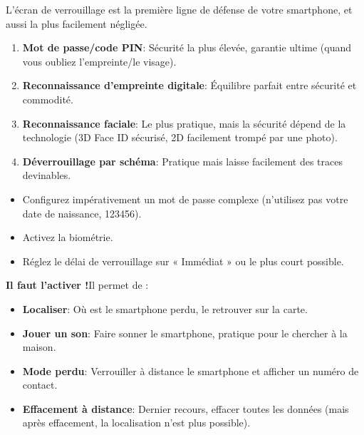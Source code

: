 


L'écran de verrouillage est la première ligne de défense de votre smartphone, et aussi la plus facilement négligée.


\begin{enumerate}
  \item \textbf{Mot de passe/code PIN}: Sécurité la plus élevée, garantie ultime (quand vous oubliez l'empreinte/le visage).
  \item \textbf{Reconnaissance d'empreinte digitale}: Équilibre parfait entre sécurité et commodité.
  \item \textbf{Reconnaissance faciale}: Le plus pratique, mais la sécurité dépend de la technologie (3D Face ID sécurisé, 2D facilement trompé par une photo).
  \item \textbf{Déverrouillage par schéma}: Pratique mais laisse facilement des traces devinables.
\end{enumerate}


\begin{itemize}
  \item Configurez impérativement un mot de passe complexe (n'utilisez pas votre date de naissance, 123456).
  \item Activez la biométrie.
  \item Réglez le délai de verrouillage sur « Immédiat » ou le plus court possible.
\end{itemize}


\textbf{Il faut l'activer !}Il permet de :

\begin{itemize}
  \item \textbf{Localiser}: Où est le smartphone perdu, le retrouver sur la carte.
  \item \textbf{Jouer un son}: Faire sonner le smartphone, pratique pour le chercher à la maison.
  \item \textbf{Mode perdu}: Verrouiller à distance le smartphone et afficher un numéro de contact.
  \item \textbf{Effacement à distance}: Dernier recours, effacer toutes les données (mais après effacement, la localisation n'est plus possible).
\end{itemize}

